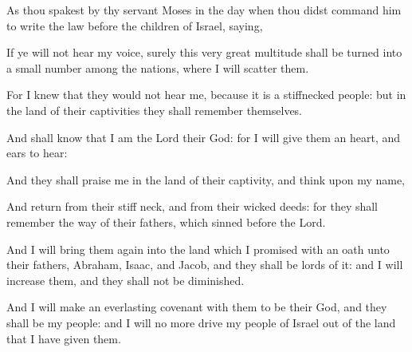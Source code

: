 {\par }{\PP {}As thou spakest by thy servant Moses in the day when thou didst command him to write the law before the children of Israel, saying,
\par }{\PP {}If ye will not hear my voice, surely this very great multitude shall be turned into a small number among the nations, where I will scatter them.
\par }{\PP {}For I knew that they would not hear me, because it is a stiffnecked people: but in the land of their captivities they shall remember themselves.
\par }{\PP {}And shall know that I am the Lord their God: for I will give them an heart, and ears to hear:
\par }{\PP {}And they shall praise me in the land of their captivity, and think upon my name,
\par }{\PP {}And return from their stiff neck, and from their wicked deeds: for they shall remember the way of their fathers, which sinned before the Lord.
\par }{\PP {}And I will bring them again into the land which I promised with an oath unto their fathers, Abraham, Isaac, and Jacob, and they shall be lords of it: and I will increase them, and they shall not be diminished.
\par }{\PP {}And I will make an everlasting covenant with them to be their God, and they shall be my people: and I will no more drive my people of Israel out of the land that I have given them.

}
